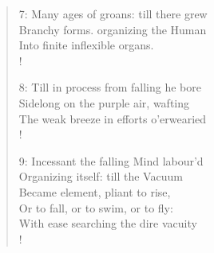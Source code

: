 \documentclass[9pt]{extarticle}
\begin{document}
\begin{verse}
\begin{altverse}
		7: Many ages of groans: till there grew\\
		Branchy forms. organizing the Human\\
		Into finite inflexible organs.\\!
		
		8: Till in process from falling he bore\\
		Sidelong on the purple air, wafting\\
		The weak breeze in efforts o’erwearied\\!
		
		9: Incessant the falling Mind labour’d\\
		Organizing itself: till the Vacuum\\
		Became element, pliant to rise,\\
		Or to fall, or to swim, or to fly:\\
		With ease searching the dire vacuity\\!
		
\end{altverse}
\end{verse}	
\end{document}
